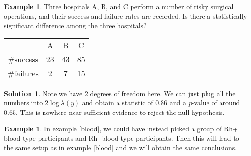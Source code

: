 \documentclass[11pt]{amsart}
\theoremstyle{definition}
\newtheorem{example}[theorem]{Example}
\newtheorem{solution}[theorem]{Solution}
\numberwithin{equation}{section}
\begin{document}
\begin{example}
    Three hospitals A, B, and C perform a number of risky surgical operations, and their success and failure rates are recorded. Is there a statistically significant difference among the three hospitals?
    \begin{center}
        \begin{tabular}{c|c|c|c}
             & A & B & C \\
            \#success & 23 & 43 & 85\\
            \#failures & 2 & 7 & 15
        \end{tabular}
    \end{center}
\end{example}
\addtocounter{theorem}{-1}
\begin{solution}
    Note we have 2 degrees of freedom here. We can just plug all the numbers into $2\log\lambda(y)$ and obtain a statistic of $0.86$ and a $p$-value of around $0.65$. This is nowhere near sufficient evidence to reject the null hypothesis.
\end{solution}
\begin{example}
    In example \ref{blood}, we could have instead picked a group of Rh+ blood type participants and Rh- blood type participants. Then this will lead to the same setup as in example \ref{blood} and we will obtain the same conclusions.
\end{example}
\end{document}
